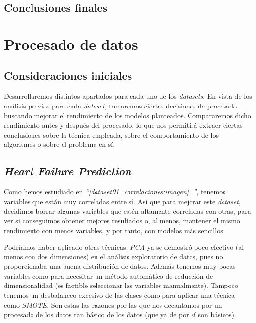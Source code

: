 \documentclass[11pt]{article}
\newcommand{\customcite}[1]{\emph{``\ref{#1}. \nameref{#1}''}}
\begin{document}
\pagebreak

\subsection{Conclusiones finales}


\pagebreak

\section{Procesado de datos}

\subsection{Consideraciones iniciales}

Desarrollaremos distintos apartados para cada uno de los \emph{datasets}. En vista de los análisis previos para cada \emph{dataset}, tomaremos ciertas decisiones de procesado buscando mejorar el rendimiento de los modelos planteados. Compararemos dicho rendimiento antes y después del procesado, lo que nos permitirá extraer ciertas conclusiones sobre la técnica empleada, sobre el comportamiento de los algoritmos o sobre el problema en sí.

\subsection{\emph{Heart Failure Prediction}} \label{dataset01_procesado_datos:seccion}

Como hemos estudiado en \customcite{dataset01_correlaciones:imagen}, tenemos variables que están muy correladas entre sí. Así que para mejorar este \emph{dataset}, decidimos borrar algunas variables que estén altamente correladas con otras, para ver si conseguimos obtener mejores resultados o, al menos, mantener el mismo rendimiento con menos variables, y por tanto, con modelos más sencillos.

Podríamos haber aplicado otras técnicas. \emph{PCA} ya se demostró poco efectivo (al menos con dos dimensiones) en el análisis exploratorio de datos, pues no proporcionaba una buena distribución de datos. Además tenemos muy pocas variables como para necesitar un método automático de reducción de dimensionalidad (es factible seleccionar las variables manualmente). Tampoco tenemos un desbalanceo excesivo de las clases como para aplicar una técnica como \emph{SMOTE}. Son estas las razones por las que nos decantamos por un procesado de los datos tan básico de los datos (que ya de por sí son básicos).
\end{document}
